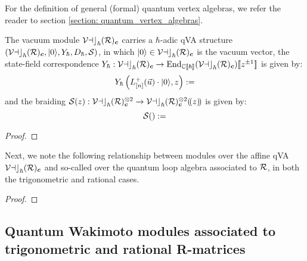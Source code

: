         For the definition of general (formal) quantum vertex algebras, we refer the reader to section \ref{section: quantum_vertex_algebras}.
        \begin{proposition} \label{prop: trigonometric_and_rational_affine_qVAs}
            The vacuum module $\mathcal{Vac}_{\hbar}(\mathcal{R})_{\boldsymbol{c}}$ carries a $\hbar$-adic qVA structure $( \mathcal{Vac}_{\hbar}(\mathcal{R})_{\boldsymbol{c}}, \lvert {0} \rangle, Y_{\hbar}, D_{\hbar}, \mathcal{S} )$, in which $\lvert {0} \rangle \in \mathcal{Vac}_{\hbar}(\mathcal{R})_{\boldsymbol{c}}$ is the vacuum vector, the state-field correspondence $Y_{\hbar}: \mathcal{Vac}_{\hbar}(\mathcal{R})_{\boldsymbol{c}} \to \operatorname{End}_{\mathbb{C}[\![\hbar]\!]}( \mathcal{Vac}_{\hbar}(\mathcal{R})_{\boldsymbol{c}} )[\![z^{\pm 1}]\!]$ is given by:
                \begin{equation} \label{equation: trigonometric_and_rational_qVAs_state_field_correpsondence}
                    Y_{\hbar}\left( L^+_{[n]}(\vec{u}) \cdot \lvert {0} \rangle, z \right) := 
                \end{equation}
            and the braiding $\calS(z): \vacuum_{\hbar}(\calR)_{\level}^{\tensor 2} \to \vacuum_{\hbar}(\calR)_{\level}^{\tensor 2}(\!(z)\!)$ is given by:
                \begin{equation} \label{equation: trigonometric_and_rational_qVAs_braiding}
                    \mathcal{S}() := 
                \end{equation}
        \end{proposition}
            \begin{proof}
                
            \end{proof}

        Next, we note the following relationship between modules over the affine qVA $\mathcal{Vac}_{\hbar}(\mathcal{R})_{\boldsymbol{c}}$ and so-called  over the quantum loop algebra associated to $\mathcal{R}$, in both the trigonometric and rational cases.
        \begin{definition} \label{def: restricted_modules_over_loop_QUEs}
            
        \end{definition}
        \begin{proposition} \label{prop: qVOA_quasi_modules_and_loop_QUE_restricted_modules}
            
        \end{proposition}
            \begin{proof}
                
            \end{proof}

    \subsection{Quantum Wakimoto modules associated to trigonometric and rational R-matrices}